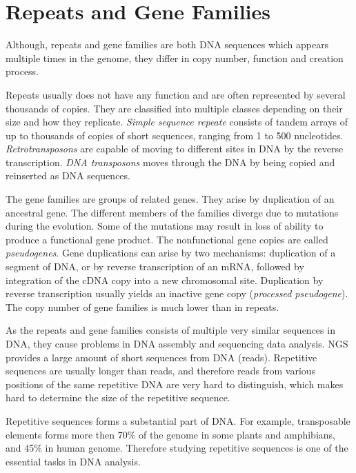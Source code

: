 \chapter{Repeats and Gene Families}\label{chap:repeatsfamilies}

Although, repeats and gene families are both DNA sequences which appears multiple times in the genome, they differ in copy number, function and creation process.

Repeats usually does not have any function and are often represented by several thousands of copies\cite{cell}. They are classified into multiple classes depending on their size and how they replicate.
\emph{Simple sequence repeate} consists of tandem arrays of up to thousands of copies of short sequences, ranging from 1 to 500 nucleotides.
\emph{Retrotransposons} are capable of moving to different sites in DNA by the reverse transcription.
\emph{DNA transposons} moves through the DNA by being copied and reinserted as DNA sequences\cite{cell}.

The gene families are groups of related genes. They arise by duplication of an ancestral gene. The different members of the families diverge due to mutations during the evolution. Some of the mutations may result in loss of ability to produce a functional gene product. The nonfunctional gene copies are called \emph{pseudogenes}.
Gene duplications can arise by two mechanisms: duplication of a segment of DNA, or by reverse transcription of an mRNA, followed by integration of the cDNA copy into a new chromosomal site.
Duplication by reverse transcription usually yields an inactive gene copy (\emph{processed pseudogene}).
The copy number of gene families is much lower than in repeats.

As the repeats and gene families consists of multiple very similar sequences in DNA, they cause problems in DNA assembly and sequencing data analysis. NGS provides a large amount of short sequences from DNA (reads). Repetitive sequences are usually longer than reads, and therefore reads from various positions of the same repetitive DNA are very hard to distinguish, which makes hard to determine the size of the repetitive sequence.

Repetitive sequences forms a substantial part of DNA. For example,
transposable elements forms more then 70\% of the genome in some plants and amphibians, and 45\% in human genome\cite{biemont2006genetics}.
Therefore studying repetitive sequences is one of the essential tasks in DNA analysis.

